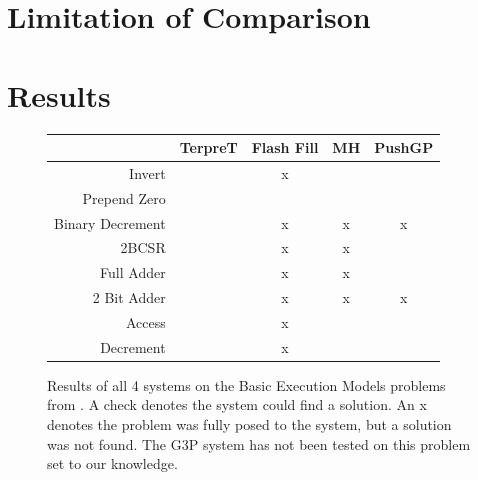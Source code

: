 \section{Limitation of Comparison}


\section{Results}


\begin{figure}
\begin{tabular}{ r | c c c c }
	& TerpreT & Flash Fill & MH & PushGP \\
	\hline
	Invert & \checkmark & x & \checkmark & \checkmark \\
	Prepend Zero & \checkmark & \checkmark & \checkmark & \checkmark \\
	Binary Decrement & \checkmark & x & x & x \\
	2BCSR & \checkmark & x & x & \checkmark \\
	Full Adder & \checkmark & x & x & \checkmark \\
	2 Bit Adder & \checkmark & x & x & x \\
	Access & \checkmark & x & \checkmark & \checkmark \\
	Decrement & \checkmark & x & \checkmark & \checkmark \\
\end{tabular}
\caption{Results of all 4 systems on the Basic Execution Models problems from \cite{Gaunt2016}.  A check denotes the system could find a solution. An x denotes the problem was fully posed to the system, but a solution was not found. The G3P system has not been tested on this problem set to our knowledge.}
\label{fig:results1}
\end{figure}

